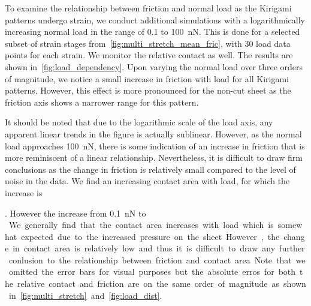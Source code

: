 To examine the relationship between friction and normal load as the Kirigami patterns undergo strain, we conduct additional simulations with a logarithmically increasing normal load in the range of 0.1 to \SI{100}{nN}. This is done for a selected subset of strain stages from~\cref{fig:multi_stretch_mean_fric}, with 30 load data points for each strain. We monitor the relative contact as well. The results are shown in~\cref{fig:load_dependency}. Upon varying the normal load over three orders of magnitude, we notice a small increase in friction with load for all Kirigami patterns. However, this effect is more pronounced for the non-cut sheet as the friction axis shows a narrower range for this pattern. 

It should be noted that due to the logarithmic scale of the load axis, any apparent linear trends in the figure is actually sublinear. However, as the normal load approaches \SI{100}{nN}, there is some indication of an increase in friction that is more reminiscent of a linear relationship. Nevertheless, it is difficult to draw firm conclusions as the change in friction is relatively small compared to the level of noise in the data. We find an increasing contact area with load, for which the increase is 

%
%
%
%

. However the increase from \SI{0.1}{nN} to \SI{}


We generally find that the contact area increases with load which is somewhat expected due to the increased pressure on the sheet. However, the change in contact area is relatively low and thus it is difficult to draw any further conlusion to the relationship between friction and contact area.  



Note that we omitted the error bars for visual purposes but the absolute erros for both the relative contact and friction are on the same order of magnitude as shown in~\cref{fig:multi_stretch} and ~\cref{fig:load_dist}.


